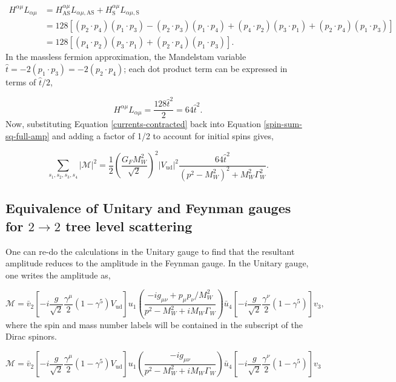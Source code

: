 \documentclass[a4paper,11pt]{article}
\begin{document}
 \begin{equation*}
 	\begin{aligned}
 		 H^{\alpha \mu}L_{\alpha \mu} &= H^{\alpha \mu}_\text{AS}L_{\alpha \mu, \text{AS}} + H^{\alpha \mu}_\text{S}L_{\alpha \mu, \text{S}}\\
 		 &=  128 \left[(p_2 \cdot p_4) (p_1 \cdot p_3) - (p_2 \cdot p_3)(p_1 \cdot p_4) +(p_4 \cdot p_2)(p_3 \cdot p_1)+(p_2 \cdot p_4)(p_1 \cdot p_3)   \right]\\
 		 &= 128\left[ (p_4 \cdot p_2)(p_3 \cdot p_1) + (p_2 \cdot p_4)(p_1 \cdot p_3)\right].
 	\end{aligned}
 \end{equation*}
In the massless fermion approximation, the Mandelstam variable $\hat{t} = -2(p_1 \cdot p_3) = -2(p_2 \cdot p_4)$;  each dot product term can be expressed in terms of $\hat{t}/2$,

\begin{equation}\label{currents-contracted}
	H^{\alpha \mu}L_{\alpha \mu} = \frac{128\hat{t}^2}{2} = 64 \hat{t}^2.
\end{equation}
Now, substituting Equation \ref{currents-contracted} back into Equation \ref{spin-sum-sq-full-amp} and adding a factor of 1/2 to account for initial spins gives,

\begin{equation}\label{final-total-amp}
	\sum_{s_1,s_2,s_3,s_4}|\mathcal{M}|^2 = \frac{1}{2}\left(\frac{G_FM_W^2}{\sqrt{2}}\right)^2|V_\text{ud}|^2 \frac{64 \hat{t}^2}{(p^2-M_W^2)^2 +M_W^2\Gamma_W^2}.
\end{equation}
 
 \subsection{Equivalence of Unitary and Feynman gauges for $2 \rightarrow 2$ tree level scattering}\label{equiv-feynman-unitary}
One can re-do the calculations in the Unitary gauge to find that the resultant amplitude reduces to the amplitude in the Feynman gauge. In the Unitary gauge, one writes the amplitude as,

$$
\mathcal{M}=
 \bar{v}_2\left[-i\frac{g}{\sqrt{2}}\frac{\gamma^\mu}{2}(1-\gamma^5)V_\text{ud}\right]u_1\left(\frac{-ig_{\mu \nu} + p_\mu p_\nu/M_W^2}{p^2 - M_W^2+ iM_W\Gamma_W}\right)\bar{u}_4\left[-i\frac{g}{\sqrt{2}}\frac{\gamma^\nu}{2}(1-\gamma^5)\right] v_3,$$
where the spin and mass number labels will be contained in the subscript of the Dirac spinors. 


$$
\mathcal{M} =  \bar{v}_2\left[-i\frac{g}{\sqrt{2}}\frac{\gamma^\mu}{2}(1-\gamma^5)V_\text{ud}\right]u_1\left(\frac{-ig_{\mu \nu}}{p^2 - M_W^2+ iM_W\Gamma_W}\right)\bar{u}_4\left[-i\frac{g}{\sqrt{2}}\frac{\gamma^\nu}{2}(1-\gamma^5)\right] v_3
$$
\end{document}
